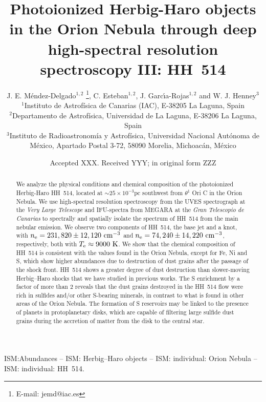 \documentclass[fleqn,usenatbib]{mnras}
\title[HH~514 in the Orion Nebula]{Photoionized Herbig-Haro objects in the Orion Nebula through deep high-spectral resolution spectroscopy III: HH~514}
\author[J. E. M\'endez-Delgado et al.]
{J. E. M\'endez-Delgado$^{1,2}$ \thanks{E-mail: jemd@iac.es},
C. Esteban$^{1,2}$, J. Garc{\'{\i}}a-Rojas$^{1,2}$ and W. J. Henney$^{3}$  
\\
$^{1}$Instituto de Astrof\'isica de Canarias (IAC), E-38205 La Laguna, Spain\\
$^{2}$Departamento de Astrof\'isica, Universidad de La Laguna, E-38206 La Laguna, Spain\\
$^{3}$Instituto de Radioastronom\'ia y Astrof\'isica, Universidad Nacional Aut\'onoma de M\'exico, Apartado Postal 3-72, 58090 Morelia, Michoac\'an, M\'exico}
\date{Accepted XXX. Received YYY; in original form ZZZ}
\begin{document}
\label{firstpage}
\pagerange{\pageref{firstpage}--\pageref{lastpage}}
\maketitle

\begin{abstract}
  We analyze the physical conditions and chemical composition of the photoionized Herbig-Haro HH~514, located at $\sim 25 \times 10^{-3} \text {pc}$ southwest from $\theta^1$ Ori C in the Orion Nebula. We use high-spectral resolution spectroscopy from the UVES spectrograph at the \textit{Very Large Telescope} and IFU-spectra from MEGARA at the \textit{Gran Telescopio de Canarias} to spectrally and spatially isolate the spectrum of HH~514 from the main nebular emission. We observe two components of HH~514, the base jet and a knot, with $n_{\rm e}= 231,820 \pm 12,120\text{ cm}^{-3}$ and $n_{\rm e}= 74,240 \pm 14,220\text{ cm}^{-3}$, respectively, both with $T_{\rm e}\approx 9000 \text{ K}$. We show that the chemical composition of HH~514 is consistent with the values found in the Orion Nebula, except for Fe, Ni and S, which show higher abundances due to  destruction of dust grains after the passage of the shock front.
  HH~514 shows a greater degree of dust destruction than slower-moving Herbig--Haro shocks that we have studied in previous works.
The S enrichment by a factor of more than 2 reveals that the dust grains destroyed in the HH~514 flow were rich in sulfides and/or other S-bearing minerals, in contrast to what is found in other areas of the Orion Nebula. The formation of S reservoirs may be linked to the presence of planets in protoplanetary disks, which are capable of filtering large sulfide dust grains during the accretion of matter from the disk to the central star. %
\end{abstract}

\begin{keywords}
ISM:Abundances – ISM: Herbig–Haro objects – ISM: individual:
Orion Nebula – ISM: individual: HH~514.
\end{keywords}
\end{document}

